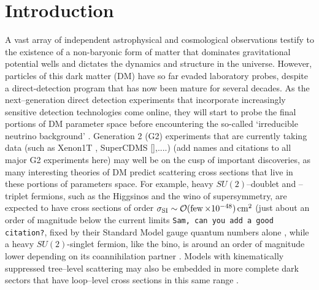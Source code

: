 \documentclass[11pt]{article}
\newcommand{\tenx}[1]{\times 10^{#1}}
\newcommand{\sjwColor}{red}
\newcommand{\sjwtt}[1]{{\color{\sjwColor}\tt #1}}
\newcommand{\vgColor}{magenta}
\newcommand{\vg}[1]{{\color{\vgColor} #1}}
\begin{document}
\section{Introduction} \setcounter{page}{2}

A vast array of independent astrophysical and cosmological observations testify to the existence of a non-baryonic form of matter that dominates gravitational potential wells and dictates the dynamics and structure in the universe. However, particles of this dark matter (DM) have so far evaded laboratory probes, despite a direct-detection program that has now been mature for several decades. As the next--generation direct detection experiments that incorporate increasingly sensitive detection technologies come online, they will start to probe the final portions of DM parameter space before encountering the so-called `irreducible neutrino background' \cite{Bauer:2013ihz,Aprile:2015uzo,Agnese:2016cpb,Malling:2011va,Newstead:2013pea,Cushman:2013zza,Billard:2013qya,Ruppin:2014bra,Davis:2014ama,Dent:2016iht}. Generation 2 (G2) experiments that are currently taking data (such as Xenon1T \cite{Aprile:2015uzo}, SuperCDMS [],....) \vg{(add names and citations to all major G2 experiments here)} may well be on the cusp of important discoveries, as many interesting theories of DM predict scattering cross sections that live in these portions of parameters space. For example, heavy $SU(2)$--doublet and --triplet fermions, such as the Higgsinos and the wino of supersymmetry, are expected to have cross sections of order $\sigma_{\rm SI} \sim \cO(\few\tenx{-48})\cm^2$ (just about an order of magnitude below the current limits \cite{}\sjwtt{Sam, can you add a good citation?}, fixed by their Standard Model gauge quantum numbers alone \cite{Hill:2011be,Hill:2013hoa,Hill:2014yxa}, while a heavy $SU(2)$-singlet fermion, like the bino, is around an order of magnitude lower depending on its coannihilation partner \cite{Berlin:2015njh}. Models with kinematically suppressed tree--level scattering may also be embedded in more complete dark sectors that have loop--level cross sections in this same range \cite{Ipek:2014gua,McDermott:2014rqa,Appelquist:2015yfa,Appelquist:2015zfa}.
\end{document}
